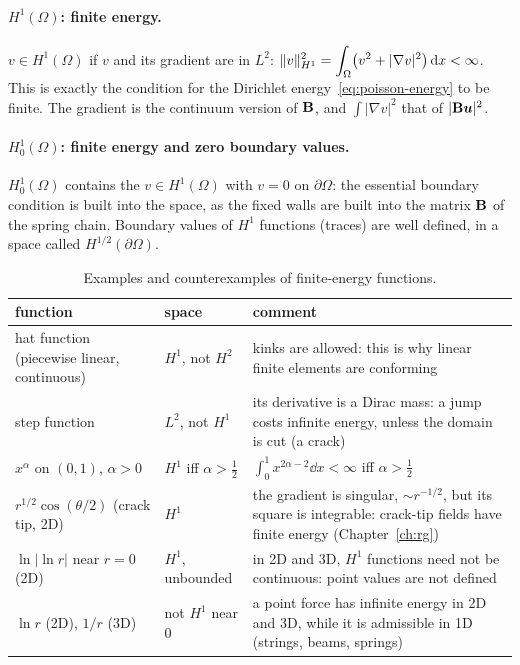 \paragraph{$H^1(\Omega)$: finite energy.}
%
$v\in H^1(\Omega)$ if $v$ and its gradient are in $L^2$:
$\displaystyle \lVert v\rVert_{H^1}^2=\int_\Omega\bigl(v^2+|\nabla v|^2\bigr)\,\mathrm{d} x<\infty$. This is
exactly the condition for the Dirichlet energy~\eqref{eq:poisson-energy} to be
finite. The gradient is the continuum version of $\mathbf{B}$, and
$\displaystyle \int|\nabla v|^2$ that of $|\mathbf{B}\bm{u}|^2$.

\paragraph{$H^1_0(\Omega)$: finite energy and zero boundary values.}
%
$H^1_0(\Omega)$ contains the $v\in H^1(\Omega)$ with $v=0$ on $\partial\Omega$:
the essential boundary condition is built into the space, as the fixed walls
are built into the matrix $\mathbf{B}$ of the spring chain. Boundary values of
$H^1$ functions (traces) are well defined, in a space called
$H^{1/2}(\partial\Omega)$.

\begin{table}[h]
\centering\small
\renewcommand{\arraystretch}{1.25}
\begin{tabular}{>{\raggedright}p{4.2cm}>{\raggedright}p{2.6cm}>{\raggedright\arraybackslash}p{7.4cm}}
\toprule
\sffamily function & \sffamily space & \sffamily comment\\
\midrule
hat function (piecewise linear, continuous) & $H^1$, not $H^2$ & kinks are allowed: this is why linear finite elements are conforming\\
step function & $L^2$, not $H^1$ & its derivative is a Dirac mass: a jump costs infinite energy, unless the domain is cut (a crack)\\
$x^\alpha$ on $(0,1)$, $\alpha>0$ & $H^1$ iff $\alpha>\tfrac12$ & $\int_0^1x^{2\alpha-2}\dd x<\infty$ iff $\alpha>\tfrac12$\\
$r^{1/2}\cos(\theta/2)$ (crack tip, 2D) & $H^1$ & the gradient is singular, $\sim r^{-1/2}$, but its square is integrable: crack-tip fields have finite energy (Chapter~\ref{ch:rg})\\
$\ln|\ln r|$ near $r=0$ (2D) & $H^1$, unbounded & in 2D and 3D, $H^1$ functions need not be continuous: point values are not defined\\
$\ln r$ (2D), $1/r$ (3D) & not $H^1$ near $0$ & a point force has infinite energy in 2D and 3D, while it is admissible in 1D (strings, beams, springs)\\
\bottomrule
\end{tabular}
\caption{Examples and counterexamples of finite-energy functions.}
\label{tab:spaces}
\end{table}

